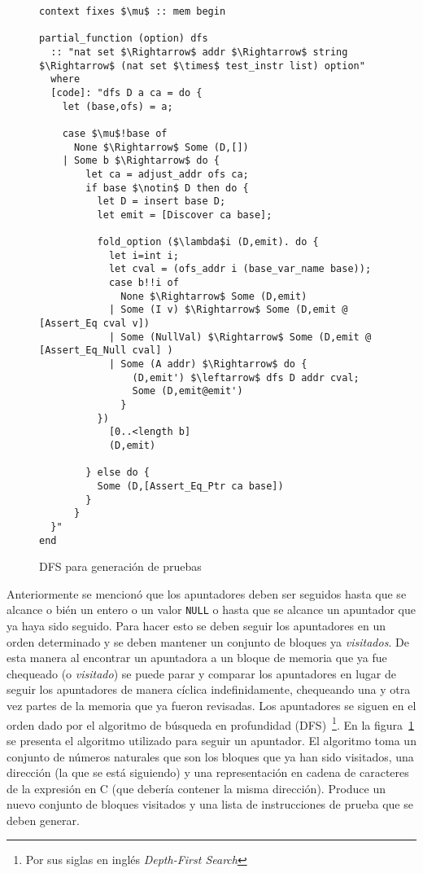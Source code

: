 \begin{figure}
\begin{lstlisting}[mathescape=true]
context fixes $\mu$ :: mem begin

partial_function (option) dfs
  :: "nat set $\Rightarrow$ addr $\Rightarrow$ string $\Rightarrow$ (nat set $\times$ test_instr list) option"
  where
  [code]: "dfs D a ca = do {
    let (base,ofs) = a;

    case $\mu$!base of
      None $\Rightarrow$ Some (D,[])
    | Some b $\Rightarrow$ do {
        let ca = adjust_addr ofs ca;
        if base $\notin$ D then do {
          let D = insert base D;
          let emit = [Discover ca base];

          fold_option ($\lambda$i (D,emit). do {
            let i=int i;
            let cval = (ofs_addr i (base_var_name base));
            case b!!i of
              None $\Rightarrow$ Some (D,emit)
            | Some (I v) $\Rightarrow$ Some (D,emit @ [Assert_Eq cval v])
            | Some (NullVal) $\Rightarrow$ Some (D,emit @ [Assert_Eq_Null cval] )
            | Some (A addr) $\Rightarrow$ do {
                (D,emit') $\leftarrow$ dfs D addr cval;
                Some (D,emit@emit')
              }
          })
            [0..<length b]
            (D,emit)

        } else do {
          Some (D,[Assert_Eq_Ptr ca base])
        }
      }
  }"
end
\end{lstlisting}

\caption{DFS para generación de pruebas}
\label{fig:dfs_test}
\end{figure}

Anteriormente se mencionó que los apuntadores deben ser seguidos hasta que se alcance o bién un entero o un valor \verb|NULL| o hasta que se alcance un apuntador que ya haya sido seguido.
Para hacer esto se deben seguir los apuntadores en un orden determinado y se deben mantener un conjunto de bloques ya \textit{visitados}.
De esta manera al encontrar un apuntadora a un bloque de memoria que ya fue chequeado (o \textit{visitado}) se puede parar y comparar los apuntadores en lugar de seguir los apuntadores de manera cíclica indefinidamente, chequeando una y otra vez partes de la memoria que ya fueron revisadas.
Los apuntadores se siguen en el orden dado por el algoritmo de búsqueda en profundidad (DFS)~\footnote{Por sus siglas en inglés \textit{Depth-First Search}}.
En la figura~\ref{fig:dfs_test} se presenta el algoritmo utilizado para seguir un apuntador.
El algoritmo toma un conjunto de números naturales que son los bloques que ya han sido visitados, una dirección (la que se está siguiendo) y una representación en cadena de caracteres de la expresión en C (que debería contener la misma dirección).
Produce un nuevo conjunto de bloques visitados y una lista de instrucciones de prueba que se deben generar.

